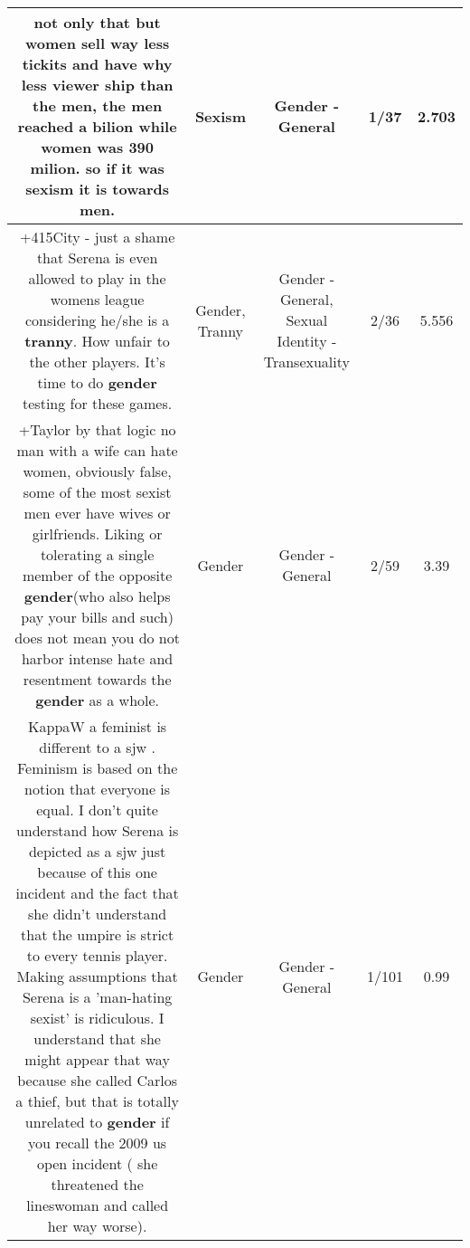 \documentclass[11pt]{article}
\newlength\mylength
\begin{document}
\begin{center}
\begin{longtable}{|C{.65\mylength}|C{.30\mylength}|C{.12\mylength}|C{.12\mylength}|C{.12\mylength}|}
  \small not only that but women sell way less tickits and have why less viewer ship than the men, the men reached a bilion while women was 390 milion. so if it was \textbf{sexism} it is towards men.\normalsize   & Sexism & Gender - General & 1/37 & 2.703 \\  \hline
  \small +415City - just a shame that Serena is even allowed to play in the womens league considering he/she is a \textbf{tranny}.  How unfair to the other players.  It's time to do \textbf{gender} testing for these games.\normalsize   & Gender, Tranny & Gender - General, Sexual Identity - Transexuality & 2/36 & 5.556 \\  \hline
  \small +Taylor by that logic no man with a wife can hate women, obviously false, some of the most sexist men ever have wives or girlfriends. Liking or tolerating a single member of the opposite \textbf{gender}(who also helps pay your bills and such) does not mean you do not harbor intense hate and resentment towards the \textbf{gender} as a whole.\normalsize   & Gender & Gender - General & 2/59 & 3.39 \\  \hline
  \small KappaW a feminist is different to a sjw . Feminism is based on the notion that everyone is equal. I don't quite understand how Serena is depicted as a sjw just because of this one incident and the fact that she didn't understand that the umpire is strict to every tennis player. Making assumptions that Serena is a 'man-hating sexist' is ridiculous. I understand that she might appear that way because she called Carlos a thief, but that is totally unrelated to \textbf{gender} if you recall the 2009 us open incident ( she threatened the lineswoman and called her way worse).\normalsize   & Gender & Gender - General & 1/101 & 0.99 \\  \hline

\end{longtable}
\end{center}
\end{document}
